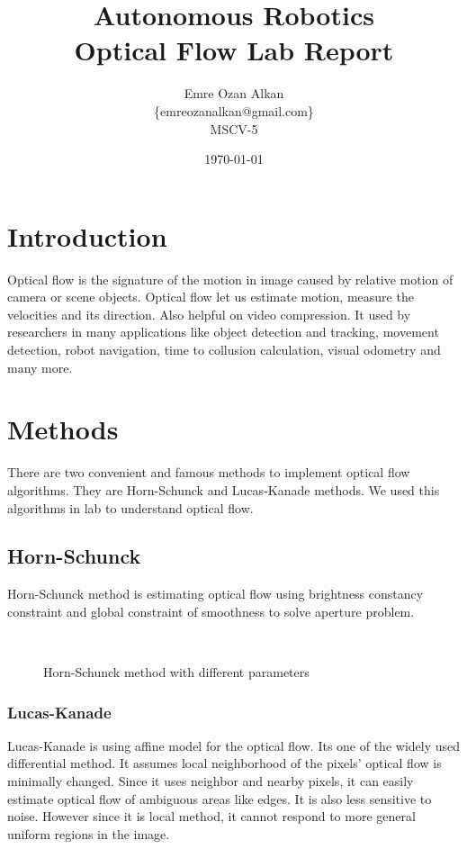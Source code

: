 \documentclass{article}
\title{Autonomous Robotics\\
		Optical Flow Lab Report}
\author{Emre Ozan Alkan\\
		\{emreozanalkan@gmail.com\}\\
		MSCV-5}
\date{\today}
\begin{document}
\maketitle

\section{Introduction}
	Optical flow is the signature of the motion in image caused by relative motion of camera or scene objects. Optical flow let us estimate motion, measure the velocities and its direction. Also helpful on video compression. It used by researchers in many applications like object detection and tracking, movement detection, robot navigation, time to collusion calculation, visual odometry and many more.

\section{Methods}
	There are two convenient and famous methods to implement optical flow algorithms. They are Horn-Schunck and Lucas-Kanade methods. We used this algorithms in lab to understand optical flow. 
	
	\subsection{Horn-Schunck}
		Horn-Schunck method is estimating optical flow using brightness constancy constraint and global constraint of smoothness to solve aperture problem.

\begin{figure}[H]
\centering
{}
\\
\caption{Horn-Schunck method with different parameters}
\label{fig:HS}
\end{figure}

	\subsubsection{Lucas-Kanade}
		Lucas-Kanade is using affine model for the optical flow. Its one of the widely used differential method. It assumes local neighborhood of the pixels' optical flow is minimally changed. Since it uses neighbor and nearby pixels, it can easily estimate optical flow of ambiguous areas like edges. It is also less sensitive to noise. However since it is local method, it cannot respond to more general uniform regions in the image.
		
\end{document}
